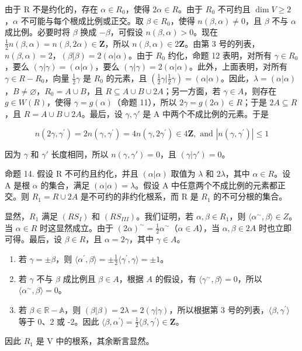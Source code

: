 由于 R 不是约化的，存在 \(\alpha\in R_{0}\)，使得 \(2\alpha\in R\)。由于 \(R_{0}\) 不可约且 \(\dim V\geqslant2\)，\(\alpha\) 不可能与每个根成比例或正交。取 \(\beta\in R_{0}\)，使得 \(n(\beta,\alpha)\neq0\)，且 \(\beta\) 不与 \(\alpha\) 成比例。必要时将 \(\beta\) 换成 \(-\beta\)，可假设 \(n(\beta,\alpha)>0\)。现在 \(\frac{1}{2}n(\beta,\alpha)=n(\beta,2\alpha)\in\mathbf{Z}\)，所以 \(n(\beta,\alpha)\in2\mathbf{Z}\)。由第 3 号的列表，\(n(\beta,\alpha)=2\)，\((\beta|\beta)=2(\alpha|\alpha)\)。由于 \(R_{0}\) 约化，命题 12 表明，对所有 \(\gamma\in R_{0}\)，要么 \((\gamma|\gamma)=(\alpha|\alpha)\)，要么 \((\gamma|\gamma)=2(\alpha|\alpha)\)。此外，上面表明，对所有 \(\gamma\in R-R_{0}\)，向量 \(\frac{1}{2}\gamma\) 是 \(R_{0}\) 的元素，且 \(\left(\frac{1}{2}\gamma|\frac{1}{2}\gamma\right)=(\alpha|\alpha)\)。因此，\(\lambda=(\alpha|\alpha)\)，\(B\neq\varnothing\)，\(R_{0}=A\cup B\)，且 \(R\subseteq A\cup B\cup2A\)；另一方面，若 \(\gamma\in A\)，则存在 \(g\in W(R)\)，使得 \(\gamma=g(\alpha)\)（命题 11），所以 \(2\gamma=g(2\alpha)\in R\)；于是 \(2A\subseteq R\)，且 \(R=A\cup B\cup2A\)。最后，设 \(\gamma,\gamma'\) 是 A 中两个不成比例的元素。于是

\[
n (2 \gamma , \gamma^ {\prime}) = 2 n (\gamma , \gamma^ {\prime}) = 4 n (\gamma , 2 \gamma^ {\prime}) \in 4 \mathbf {Z}, \text { and } | n (\gamma , \gamma^ {\prime}) | \leqslant 1
\]

因为 \(\gamma\) 和 \(\gamma'\) 长度相同，所以 \(n(\gamma, \gamma') = 0\)，且 \((\gamma|\gamma') = 0\)。

命题 14. 假设 R 不可约且约化，并且 \((\alpha|\alpha)\) 取值为 \(\lambda\) 和 \(2\lambda\)，其中 \(\alpha\in R\)。设 A 是根 \(\alpha\) 的集合，满足 \((\alpha|\alpha)=\lambda\)。假设 A 中任意两个不成比例的元素都正交。则 \(R_{1}=R\cup2A\) 是不可约的非约化根系，而 R 是 \(R_{1}\) 的不可分根的集合。

显然，\(R_{1}\) 满足 \((RS_{I})\) 和 \((RS_{III})\)。我们证明，若 \(\alpha, \beta \in R_{1}\)，则 \(\langle\alpha^{\sim}, \beta\rangle \in Z\)。当 \(\alpha \in R\) 时这显然成立。由于 \((2\alpha)^{\sim} = \frac{1}{2}\alpha^{\sim}\)（\(\alpha \in A\)），当 \(\alpha, \beta \in 2A\) 时也立即可得。最后，设 \(\beta \in R\)，且 \(\alpha = 2\gamma\)，其中 \(\gamma \in A\)。

\begin{enumerate}
\def\labelenumi{\arabic{enumi})}
\item
  若 \(\gamma = \pm \beta\)，则 \(\langle \alpha^{\prime},\beta \rangle = \pm \frac{1}{2}\langle \gamma^{\prime},\gamma \rangle = \pm 1\)。
\item
  若 \(\gamma\) 不与 \(\beta\) 成比例且 \(\beta \in A\)，根据 \(A\) 的假设，有 \(\langle \gamma^{\sim},\beta \rangle = 0\)，所以 \(\langle \alpha^{\sim},\beta \rangle = 0\)。
\item
  若 \(\beta \in \mathbb{R} - \mathbb{A}\)，则 \((\beta |\beta) = 2\lambda = 2(\gamma |\gamma)\)，所以根据第 3 号的列表，\(\langle \beta, \gamma^{\prime} \rangle\) 等于 0、2 或 -2。因此 \(\langle \beta, \alpha^{\prime} \rangle = \frac{1}{2}\langle \beta, \gamma^{\prime} \rangle \in \mathbf{Z}\)。
\end{enumerate}

因此 \(R_{1}\) 是 V 中的根系，其余断言显然。

